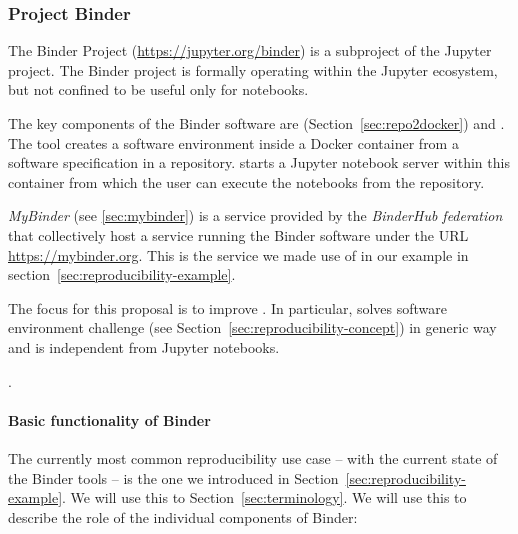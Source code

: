 \subsubsection{Project Binder}\label{seq:project-binder}

The Binder Project \cite{binder} (\url{https://jupyter.org/binder}) is
a subproject of the Jupyter project. The Binder project is formally operating
within the Jupyter ecosystem, but not confined to be useful only for notebooks.

The key components of the Binder software are \repotodocker{}
(Section~\ref{sec:repo2docker}) and \binderhub{}. The \repotodocker{} tool
creates a software environment inside a Docker container from a software
specification in a repository. \binderhub{} starts a Jupyter notebook server
within this container from which the user can execute the notebooks from the
repository.

\emph{MyBinder} (see \ref{sec:mybinder}) is a service provided by the \emph{BinderHub
  federation} that collectively host a service running the Binder software
under the URL \url{https://mybinder.org}. This is the service we made use of in
our example in section~\ref{sec:reproducibility-example}.

The focus for this proposal is to improve \repotodocker{}. In particular,
\repotodocker{} solves software environment challenge (see
Section~\ref{sec:reproducibility-concept}) in generic way and is independent
from Jupyter notebooks.

.

\paragraph{Basic functionality of Binder}
\label{binder-how-does-it-work}

The currently most common reproducibility use case -- with the current state of the Binder
tools -- is the one we introduced in
Section~\ref{sec:reproducibility-example}. We will use this to
Section~\ref{sec:terminology}. We will use this to
describe the role of the individual components of Binder:


